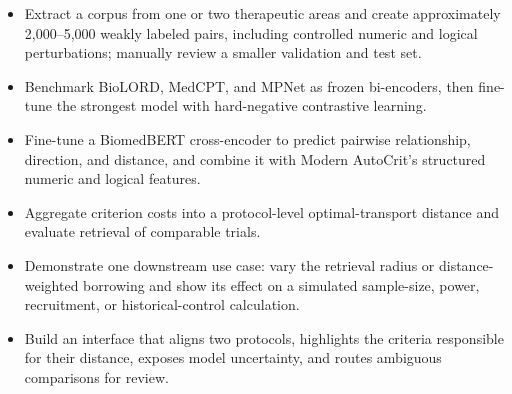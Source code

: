 \documentclass[11pt]{article}
\begin{document}
\begin{itemize}
    \item Extract a corpus from one or two therapeutic areas and create approximately 2,000--5,000 weakly labeled pairs, including controlled numeric and logical perturbations; manually review a smaller validation and test set.
    \item Benchmark BioLORD, MedCPT, and MPNet as frozen bi-encoders, then fine-tune the strongest model with hard-negative contrastive learning.
    \item Fine-tune a BiomedBERT cross-encoder to predict pairwise relationship, direction, and distance, and combine it with Modern AutoCrit's structured numeric and logical features.
    \item Aggregate criterion costs into a protocol-level optimal-transport distance and evaluate retrieval of comparable trials.
    \item Demonstrate one downstream use case: vary the retrieval radius or distance-weighted borrowing and show its effect on a simulated sample-size, power, recruitment, or historical-control calculation.
    \item Build an interface that aligns two protocols, highlights the criteria responsible for their distance, exposes model uncertainty, and routes ambiguous comparisons for review.
\end{itemize}
\end{document}

